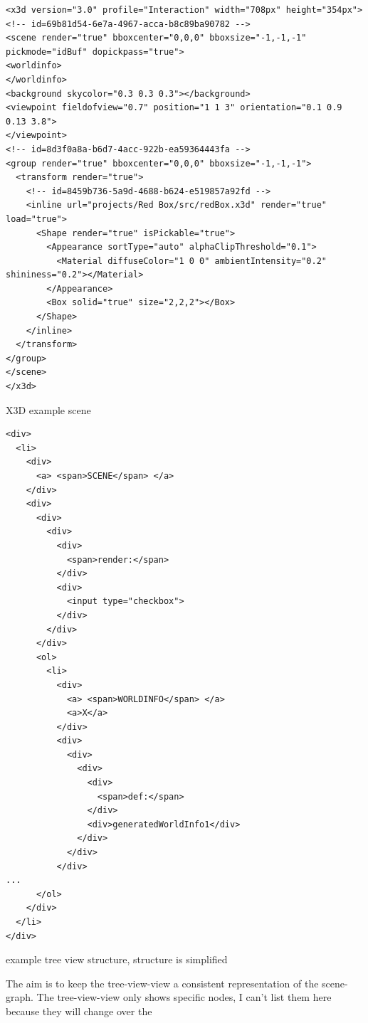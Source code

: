 \begin{listing}
  \begin{verbatim}
<x3d version="3.0" profile="Interaction" width="708px" height="354px">
<!-- id=69b81d54-6e7a-4967-acca-b8c89ba90782 -->
<scene render="true" bboxcenter="0,0,0" bboxsize="-1,-1,-1" pickmode="idBuf" dopickpass="true">
<worldinfo>
</worldinfo>
<background skycolor="0.3 0.3 0.3"></background>
<viewpoint fieldofview="0.7" position="1 1 3" orientation="0.1 0.9 0.13 3.8">
</viewpoint>
<!-- id=8d3f0a8a-b6d7-4acc-922b-ea59364443fa -->
<group render="true" bboxcenter="0,0,0" bboxsize="-1,-1,-1">
  <transform render="true">
    <!-- id=8459b736-5a9d-4688-b624-e519857a92fd -->
    <inline url="projects/Red Box/src/redBox.x3d" render="true" load="true">
      <Shape render="true" isPickable="true">
        <Appearance sortType="auto" alphaClipThreshold="0.1">
          <Material diffuseColor="1 0 0" ambientIntensity="0.2" shininess="0.2"></Material>
        </Appearance>
        <Box solid="true" size="2,2,2"></Box>
      </Shape>
    </inline>
  </transform>
</group>
</scene>
</x3d>
  \end{verbatim}
	\caption{X3D example scene}
	\label{list:x3dscene}
\end{listing}

\begin{listing}
  \begin{verbatim}
<div>
  <li>
    <div>
      <a> <span>SCENE</span> </a>
    </div>
    <div>
      <div>
        <div>
          <div>
            <span>render:</span>
          </div>
          <div>
            <input type="checkbox">
          </div>
        </div>
      </div>
      <ol>
        <li>
          <div>
            <a> <span>WORLDINFO</span> </a>
            <a>X</a>
          </div>
          <div>
            <div>
              <div>
                <div>
                  <span>def:</span>
                </div>
                <div>generatedWorldInfo1</div>
              </div>
            </div>
          </div>
...
      </ol>
    </div>
  </li>
</div>
  \end{verbatim}
  \caption{example tree view structure, structure is simplified}
  \label{list:tree-view}
\end{listing}

The aim is to keep the tree-view-view a consistent representation of the
scene-graph. The tree-view-view only shows specific nodes, I can't list
them here because they will change over the

